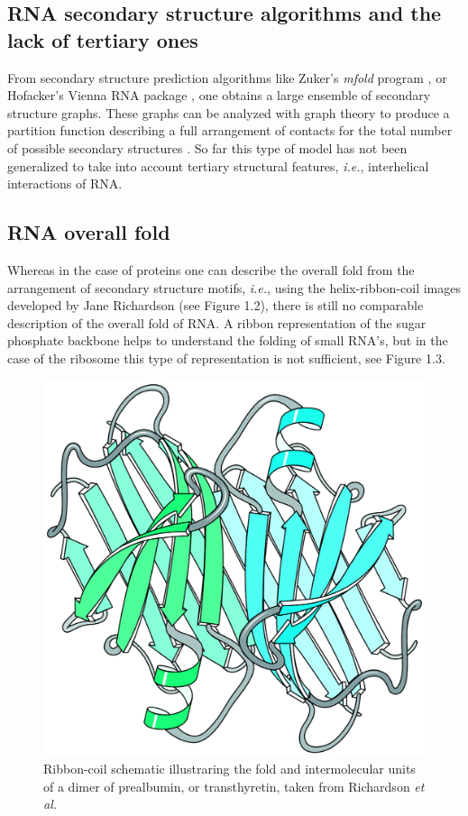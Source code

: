 \subsection{RNA secondary structure algorithms and the lack of tertiary ones}
From secondary structure prediction algorithms like Zuker's
\textit{mfold} program \cite{zuker2003}, or Hofacker's Vienna RNA
package \cite{hofacker1994}, one obtains a large ensemble of
secondary structure graphs. These graphs can be analyzed with graph
theory to produce a partition function describing a full arrangement
of contacts for the total number of possible secondary structures
\cite{chen2000}. So far this type of model has not been generalized
to take into account tertiary structural features, \textit{i.e.},
interhelical interactions of RNA.

\subsection{RNA overall fold}
Whereas in the case of proteins one can describe the overall fold
from the arrangement of secondary structure motifs, \textit{i.e.}, using the
helix-ribbon-coil images developed by Jane Richardson
\cite{richardson2000} (see Figure 1.2), there is still no comparable
description of the overall fold of RNA. A ribbon
representation of the sugar phosphate backbone helps to understand the
folding of small RNA's, but in the case of the ribosome this type of 
representation is not sufficient, see Figure 1.3.

\begin{figure}[ht]
\centering
\includegraphics[scale=0.4]{Chapter1/overallfold.png}
\caption{Ribbon-coil schematic illustraring the fold and
  intermolecular units of a dimer of prealbumin, or
transthyretin, taken from Richardson \textit{et al.} \cite{richardson2002}}
\end{figure}

